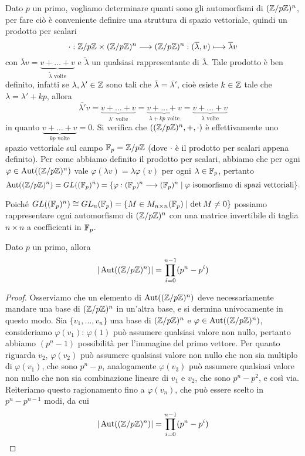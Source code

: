 \documentclass[11pt]{scrartcl}
\begin{document}
Dato $p$ un primo, vogliamo determinare quanti sono gli automorfismi di 
$({\mathbb Z}/p{\mathbb Z})^n$, per fare ciò è conveniente definire una struttura di spazio vettoriale,
quindi un prodotto per scalari\[
    \cdot:{\mathbb Z}/p{\mathbb Z}\times ({\mathbb Z}/p{\mathbb Z})^n \longrightarrow ({\mathbb Z}/p{\mathbb Z})^n : 
    (\overline{\lambda}, v)\longmapsto \overline{\lambda}v
\]
con $\overline{\lambda}v = \underset{\tilde{\lambda}\text{ volte}}{\underbrace{v + \ldots + v}}$
e $\tilde{\lambda}$ un qualsiasi rappresentante di $\overline{\lambda}$.
Tale prodotto è ben definito, infatti se $\lambda, \lambda' \in \mathbb Z$ sono tali che
$\overline{\lambda} = \overline{\lambda'}$, cioè esiste $k \in \mathbb Z$ tale che
$\lambda = \lambda' + kp$, allora \[
    \overline{\lambda'} v = \underset{\lambda'\text{ volte}}{\underbrace{v + \ldots + v}} = 
    \underset{\lambda + kp\text{ volte}}{\underbrace{v + \ldots + v}} = 
    \underset{\lambda\text{ volte}}{\underbrace{v + \ldots + v}}
\]in quanto $\underset{kp\text{ volte}}{\underbrace{v + \ldots + v}} = 0$. 
Si verifica che $(({\mathbb Z}/p{\mathbb Z})^n, +, \cdot)$ è effettivamente uno spazio vettoriale
sul campo $\mathbb F_p = {\mathbb Z}/p{\mathbb Z}$ (dove $\cdot$ è il prodotto per scalari appena definito).
Per come abbiamo definito il prodotto per scalari, abbiamo che per ogni
$\varphi \in \operatorname{Aut}(({\mathbb Z}/p{\mathbb Z})^n)$ vale $\varphi(\lambda v) = \lambda\varphi(v)$ 
per ogni $\lambda \in \mathbb F_p$, pertanto
\[
    \operatorname{Aut}(({\mathbb Z}/p{\mathbb Z})^n) = GL((\mathbb F_p)^n) = \{\varphi: (\mathbb F_p)^n\longrightarrow(\mathbb F_p)^n
    \mid\varphi\text{ isomorfismo di spazi vettoriali}\}.
\]

Poiché $GL((\mathbb F_p)^n) \cong GL_n(\mathbb F_p) = \{M \in M_{n\times n}(\mathbb F_p)\mid \det M \neq 0\}$
possiamo rappresentare ogni automorfismo di $({\mathbb Z}/p{\mathbb Z})^n$ con una matrice invertibile
di taglia $n\times n$ a coefficienti in $\mathbb F_p$.

\begin{proposition}
Dato $p$ un primo, allora \[
    |\operatorname{Aut}(({\mathbb Z}/p{\mathbb Z})^n)| = \prod_{i = 0}^{n - 1} (p^n - p^i)
    \]
\end{proposition}

\begin{proof}
    Osserviamo che un elemento di $\operatorname{Aut}(({\mathbb Z}/p{\mathbb Z})^n)$ deve necessariamente mandare 
    una base di $({\mathbb Z}/p{\mathbb Z})^n$ in un'altra base, e si dermina univocamente in questo 
    modo. Sia $\{v_1, \ldots, v_n\}$ una base di $({\mathbb Z}/p{\mathbb Z})^n$ e $\varphi \in 
    \operatorname{Aut}(({\mathbb Z}/p{\mathbb Z})^n)$, consideriamo $\varphi(v_1)$: $\varphi(1)$ può assumere
    qualsiasi valore non nullo, pertanto abbiamo $(p^n - 1)$ possibilità per 
    l'immagine del primo vettore. Per quanto riguarda $v_2$, $\varphi(v_2)$
    può assumere qualsiasi valore non nullo che non sia multiplo di $\varphi(v_1)$,
    che sono $p^n - p$, analogamente $\varphi(v_3)$ può assumere qualsiasi
    valore non nullo che non sia combinazione lineare di $v_1$ e $v_2$, che sono
    $p^n - p^2$, e così via. Reiteriamo questo ragionamento fino a $\varphi(v_n)$,
    che può essere scelto in $p^n - p^{n - 1}$ modi, da cui \[
        |\operatorname{Aut}(({\mathbb Z}/p{\mathbb Z})^n)| = \prod_{i = 0}^{n - 1}(p^n - p^i)
    \]
\end{proof}
\end{document}
